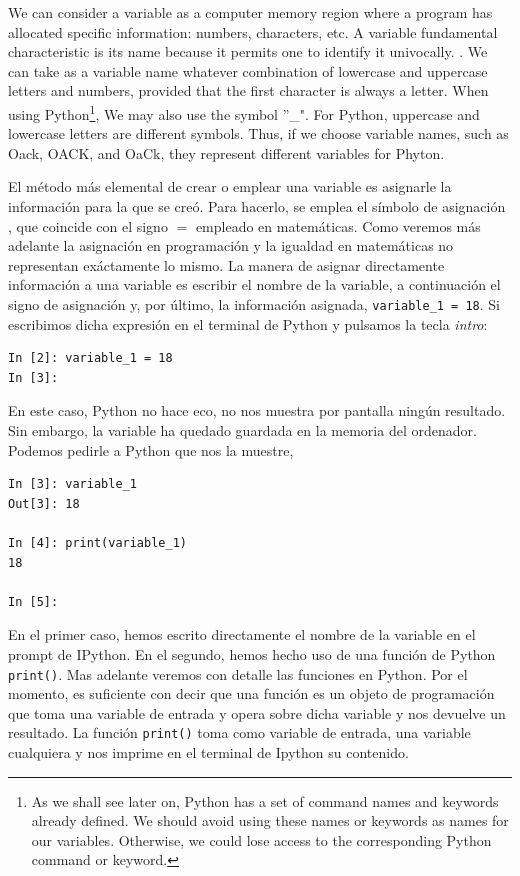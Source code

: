 \begin{paracol}{2}
\switchcolumn
We can consider a variable as a computer memory region where a program has allocated specific information: numbers, characters, etc. A variable fundamental characteristic is its name because it permits one to identify it univocally. . We can take as a variable name whatever combination of lowercase and uppercase letters and numbers, provided that the first character is always a letter. When using Python\footnote{As we shall see later on, Python has a set of command names and keywords already defined. We should avoid using these names or keywords as names for our variables. Otherwise, we could lose access to the corresponding Python command or keyword.}, We may also use the symbol ''\_". For Python, uppercase and lowercase letters are different symbols. Thus, if we choose variable names, such as Oack, OACK, and OaCk, they represent different variables for Phyton.

\switchcolumn
El método más elemental de crear o emplear una variable es asignarle la información para la que se creó. Para hacerlo, se emplea el símbolo de asignación  , que coincide con el signo $=$ empleado en matemáticas. Como veremos más adelante la asignación en programación y la igualdad en matemáticas no representan exáctamente lo mismo. La manera de asignar directamente información a una variable es escribir el nombre de la variable, a continuación  el signo de asignación y, por último, la información asignada, \texttt{variable_1 = 18}. Si escribimos dicha expresión en el terminal de Py\-thon y pulsamos la tecla \emph{intro}:
\begin{verbatim}
In [2]: variable_1 = 18
In [3]:
\end{verbatim}
En este caso, Python no hace eco, no nos muestra por pantalla ningún resultado. Sin embargo, la variable ha quedado guardada en la memoria del ordenador. Podemos pedirle a Python que nos la muestre, 
\begin{verbatim}
In [3]: variable_1
Out[3]: 18

In [4]: print(variable_1)
18

In [5]: 
\end{verbatim}
En el primer caso, hemos escrito directamente el nombre de la variable en el prompt de IPython. En el segundo, hemos hecho uso de una función de Python \texttt{print()}. Mas adelante veremos con detalle las funciones en Python. Por el momento, es suficiente con decir que una función es un objeto de programación que toma una variable de entrada y opera sobre dicha variable y nos devuelve un resultado. La  función \texttt{print()} toma como variable de entrada, una variable cualquiera y nos imprime en el terminal de Ipython su contenido.


\end{paracol}
